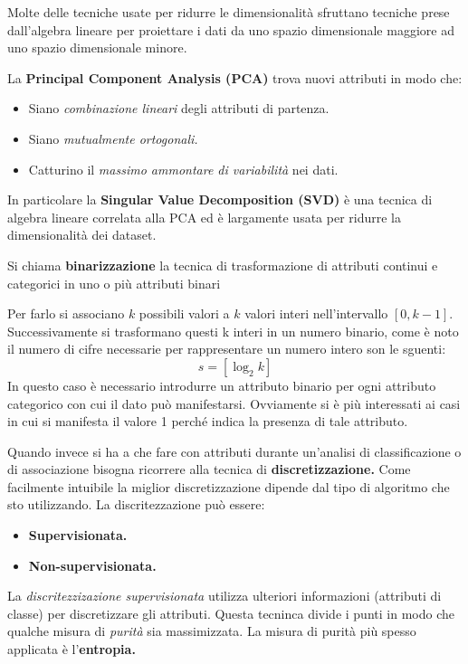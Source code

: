 Molte delle tecniche usate per ridurre le dimensionalità sfruttano tecniche prese dall'algebra lineare per proiettare i dati da uno spazio dimensionale maggiore ad uno spazio dimensionale minore.

La \textbf{Principal Component Analysis (PCA)} trova nuovi attributi in modo che:
\begin{itemize}
	\item Siano \textit{combinazione lineari} degli attributi di partenza.
	\item Siano \textit{mutualmente ortogonali.}
	\item Catturino il \textit{massimo ammontare di variabilità} nei dati.
\end{itemize}

In particolare la \textbf{Singular Value Decomposition (SVD)} è una tecnica di algebra lineare correlata alla PCA ed è largamente usata per ridurre la dimensionalità dei dataset.

\begin{defn}
	Si chiama \textbf{binarizzazione} la tecnica di trasformazione di attributi continui e categorici in uno o più attributi binari
\end{defn}
Per farlo si associano $k$ possibili valori a $k$ valori interi nell'intervallo $[0, k-1]$. Successivamente si trasformano questi k interi in un numero binario, come è noto il numero di cifre necessarie per rappresentare un numero intero son le sguenti:
\[s = [\log_{2}k]\] 
 In questo caso è necessario introdurre un attributo binario per ogni attributo categorico con cui il dato può manifestarsi. Ovviamente si è più interessati ai casi in cui si manifesta il valore 1 perché indica la presenza di tale attributo.

 Quando invece si ha a che fare con attributi durante un'analisi di classificazione o di associazione bisogna ricorrere alla tecnica di \textbf{discretizzazione.} Come facilmente intuibile la miglior discretizzazione dipende dal tipo di algoritmo che sto utilizzando.
 La discritezzazione può essere:
 
 \begin{itemize}
 	\item \textbf{Supervisionata.}
 	\item \textbf{Non-supervisionata.}
 \end{itemize}
La \textit{discritezzizazione supervisionata} utilizza ulteriori informazioni (attributi di classe) per discretizzare gli attributi. Questa tecninca divide i punti in modo che qualche misura di \textit{purità} sia massimizzata. La misura di purità più spesso applicata è l'\textbf{entropia.}
 	
